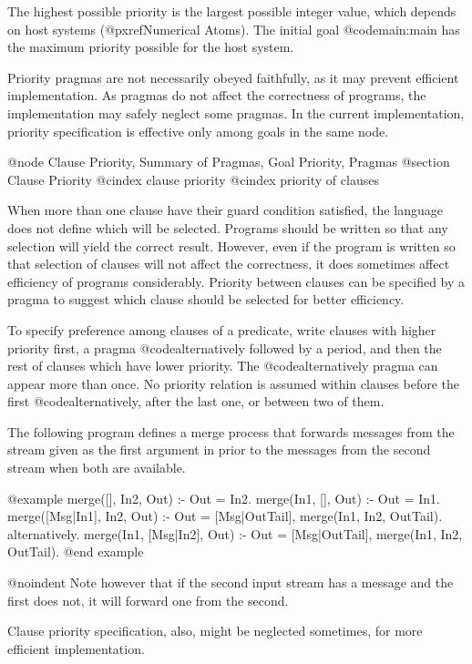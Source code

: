 {The highest possible priority is the largest possible integer value,
which depends on host systems (@pxref{Numerical Atoms}).  The initial
goal @code{main:main} has the maximum priority possible for the host
system.

Priority pragmas are not necessarily obeyed faithfully, as it may
prevent efficient implementation.  As pragmas do not affect the
correctness of programs, the implementation may safely neglect some
pragmas.  In the current implementation, priority specification is
effective only among goals in the same node.

@node Clause Priority, Summary of Pragmas, Goal Priority, Pragmas
@section Clause Priority
@cindex clause priority
@cindex priority of clauses

When more than one clause have their guard condition satisfied, the
language does not define which will be selected.  Programs should be
written so that any selection will yield the correct result.  However,
even if the program is written so that selection of clauses will not
affect the correctness, it does sometimes affect efficiency of programs
considerably.  Priority between clauses can be specified by a pragma to
suggest which clause should be selected for better efficiency.

To specify preference among clauses of a predicate, write clauses with
higher priority first, a pragma @code{alternatively} followed by a
period, and then the rest of clauses which have lower priority.  The
@code{alternatively} pragma can appear more than once.  No priority
relation is assumed within clauses before the first
@code{alternatively}, after the last one, or between two of them.

The following program defines a merge process that forwards messages
from the stream given as the first argument in prior to the messages
from the second stream when both are available.

@example
merge([], In2, Out) :- Out = In2.
merge(In1, [], Out) :- Out = In1.
merge([Msg|In1], In2, Out) :-
    Out = [Msg|OutTail],
    merge(In1, In2, OutTail).
alternatively.
merge(In1, [Msg|In2], Out) :-
    Out = [Msg|OutTail],
    merge(In1, In2, OutTail).
@end example

@noindent
Note however that if the second input stream has a message and the first
does not, it will forward one from the second.

Clause priority specification, also, might be neglected sometimes, for
more efficient implementation.

}
